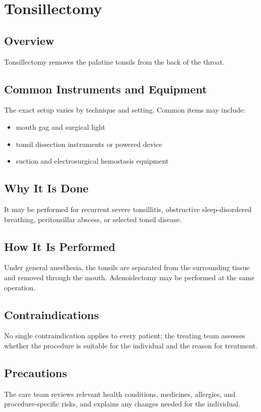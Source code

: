 \chapter{Tonsillectomy}
\section*{Overview}
Tonsillectomy removes the palatine tonsils from the back of the throat.
\section*{Common Instruments and Equipment}
The exact setup varies by technique and setting. Common items may include:
\begin{itemize}[nosep,leftmargin=*]
  \item mouth gag and surgical light
  \item tonsil dissection instruments or powered device
  \item suction and electrosurgical hemostasis equipment
\end{itemize}

\section*{Why It Is Done}
It may be performed for recurrent severe tonsillitis, obstructive sleep-disordered breathing, peritonsillar abscess, or selected tonsil disease.
\section*{How It Is Performed}
Under general anesthesia, the tonsils are separated from the surrounding tissue and removed through the mouth. Adenoidectomy may be performed at the same operation.
\section*{Contraindications}
No single contraindication applies to every patient; the treating team assesses whether the procedure is suitable for the individual and the reason for treatment.

\section*{Precautions}
The care team reviews relevant health conditions, medicines, allergies, and procedure-specific risks, and explains any changes needed for the individual.

